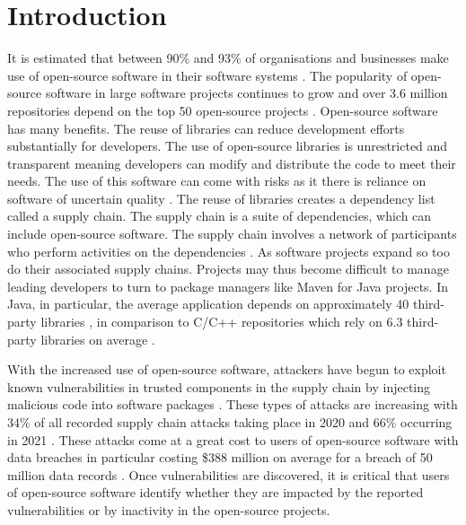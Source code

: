 \documentclass[conference]{IEEEtran}
\begin{document}
\section{Introduction}
It is estimated that between 90\% and 93\% of organisations and businesses make use of open-source software in their software systems \cite{zajdel_open_2022}. The popularity of open-source software in large software projects continues to grow and over 3.6 million repositories depend on the top 50 open-source projects \cite{subramanian_empirical_2020}. Open-source software has many benefits. The reuse of libraries can reduce development efforts substantially for developers. The use of open-source libraries is unrestricted and transparent meaning developers can modify and distribute the code to meet their needs. The use of this software can come with risks as it there is reliance on software of uncertain quality \cite{zajdel_open_2022}. The reuse of libraries creates a dependency list called a supply chain. The supply chain is a suite of dependencies, which can include open-source software. The supply chain involves a network of participants who perform activities on the dependencies \cite{k_singi_trusted_2019}. As software projects expand so too do their associated supply chains. Projects may thus become difficult to manage leading developers to turn to package managers like Maven for Java projects. In Java, in particular, the average application depends on approximately 40 third-party libraries \cite{a_m_mir_effect_2023}, in comparison to C/C++ repositories which rely on 6.3 third-party libraries on average \cite{tang_towards_2023}.

With the increased use of open-source software, attackers have begun to exploit known vulnerabilities in trusted components in the supply chain by injecting malicious code into software packages \cite{ohm_backstabbers_2020}. These types of attacks are increasing with 34\% of all recorded supply chain attacks taking place in 2020 and 66\% occurring in 2021 \cite{m_z_malik_protection_2023}. These attacks come at a great cost to users of open-source software with data breaches in particular costing \$388 million on average for a breach of 50 million data records \cite{x_wang_feasibility_2021}. Once vulnerabilities are discovered, it is critical that users of open-source software identify whether they are impacted by the reported vulnerabilities or by inactivity in the open-source projects. 
\end{document}
